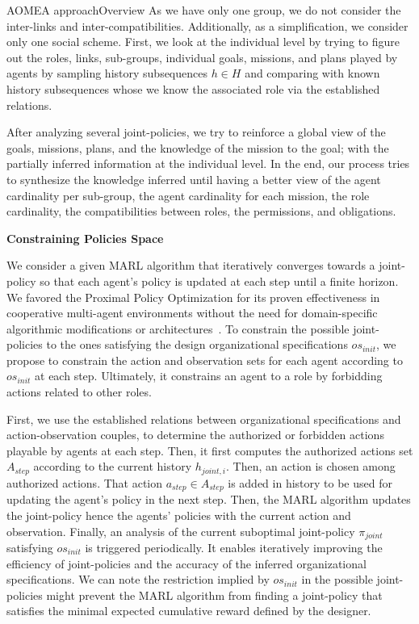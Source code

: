 \begin{frame}{AOMEA approach}{Overview}
    As we have only one group, we do not consider the inter-links and inter-compatibilities. Additionally, as a simplification, we consider only one social scheme.
    First, we look at the individual level by trying to figure out the roles, links, sub-groups, individual goals, missions, and plans played by agents by sampling history subsequences $h \in H$ and comparing with known history subsequences whose we know the associated role via the established relations.

    After analyzing several joint-policies, we try to reinforce a global view of the goals, missions, plans, and the knowledge of the mission to the goal; with the partially inferred information at the individual level.
    In the end, our process tries to synthesize the knowledge inferred until having a better view of the agent cardinality per sub-group, the agent cardinality for each mission, the role cardinality, the compatibilities between roles, the permissions, and obligations.

    \textbf{Constraining Policies Space}

    We consider a given MARL algorithm that iteratively converges towards a joint-policy so that each agent's policy is updated at each step until a finite horizon.
    We favored the Proximal Policy Optimization for its proven effectiveness in cooperative multi-agent environments without the need for domain-specific algorithmic modifications or architectures~\cite{Yu2022}.
    To constrain the possible joint-policies to the ones satisfying the design organizational specifications $os_{init}$, we propose to constrain the action and observation sets for each agent according to $os_{init}$ at each step. Ultimately, it constrains an agent to a role by forbidding actions related to other roles.

    First, we use the established relations between organizational specifications and action-observation couples, to determine the authorized or forbidden actions playable by agents at each step.
    Then, it first computes the authorized actions set $A_{step}$ according to the current history $h_{joint,i}$. Then, an action is chosen among authorized actions. That action $a_{step} \in A_{step}$ is added in history to be used for updating the agent's policy in the next step. Then, the MARL algorithm updates the joint-policy hence the agents' policies with the current action and observation.
    Finally, an analysis of the current suboptimal joint-policy $\pi_{joint}$ satisfying $os_{init}$ is triggered periodically. It enables iteratively improving the efficiency of joint-policies and the accuracy of the inferred organizational specifications.
    We can note the restriction implied by $os_{init}$ in the possible joint-policies might prevent the MARL algorithm from finding a joint-policy that satisfies the minimal expected cumulative reward defined by the designer.

\end{frame}


